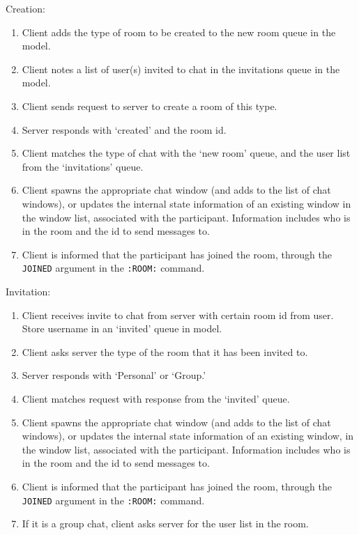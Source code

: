 Creation:
\begin{enumerate}
\item Client adds the type of room to be created to the new room queue in the model.
\item Client notes a list of user(s) invited to chat in the invitations queue in the model.
\item Client sends request to server to create a room of this type.
\item Server responds with `created' and the room id.
\item Client matches the type of chat with the `new room' queue, and the user list from the `invitations' queue.
\item Client spawns the appropriate chat window (and adds to the list of chat windows), or updates the internal state information of an existing window in the window list, associated with the participant. Information includes who is in the room and the id to send messages to.
\item Client is informed that the participant has joined the room, through the \texttt{JOINED} argument in the \texttt{:ROOM:} command.
\end {enumerate}

Invitation:
\begin{enumerate}
\item Client receives invite to chat from server with certain room id from user. Store username in an `invited' queue in model.  
\item Client asks server the type of the room that it has been invited to.
\item Server responds with `Personal' or `Group.'
\item Client matches request with response from the `invited' queue.
\item Client spawns the appropriate chat window (and adds to the list of chat windows), or updates the internal state information of an existing window, in the window list, associated with the participant. Information includes who is in the room and the id to send messages to.
\item Client is informed that the participant has joined the room, through the \texttt{JOINED} argument in the \texttt{:ROOM:} command.
\item If it is a group chat, client asks server for the user list in the room.
\end{enumerate}

